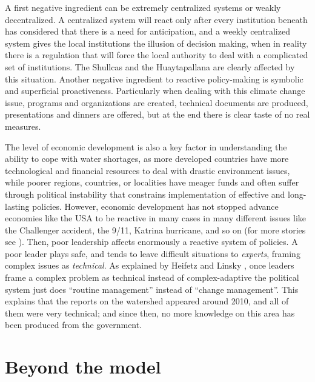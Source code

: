 \documentclass{article}
\begin{document}
A first negative ingredient can be extremely centralized systems or weakly decentralized. A centralized system will react only after every institution beneath has considered that there is a need for anticipation, and a weekly centralized system gives the local institutions the illusion of decision making, when in reality there is a regulation that will force the local authority to deal with a complicated set of institutions. The Shullcas and the Huaytapallana are clearly affected by this situation. Another negative ingredient to reactive policy-making is symbolic and superficial proactiveness. Particularly when dealing with this climate change issue, programs and organizations are created, technical documents are produced, presentations and dinners are offered, but at the end there is clear taste of no real measures. 

The level of economic development is also a key factor in understanding the ability to cope with water shortages, as more developed countries have more technological and financial resources to deal with drastic environment issues, while poorer regions, countries, or localities have meager funds and often suffer through political instability that constrains implementation of effective and long-lasting policies. However, economic development has not stopped advance economies like the USA to be reactive in many cases in many different issues like the Challenger accident, the 9/11, Katrina hurricane, and so on (for more stories see \cite{bazerman_predictable_2004}). Then, poor leadership affects enormously a reactive system of policies. A poor leader plays safe, and tends to leave difficult situations to \emph{experts}, framing complex issues as \emph{technical}.  As explained by Heifetz and Linsky \cite{heifetz_leadership_2002}, 
once leaders frame a complex problem as technical instead of complex-adaptive the political system just does ``routine management'' instead of ``change management''. This explains that the reports on the watershed appeared around 2010, and all of them were very technical; and since then, no more knowledge on this area has been produced from the government.



\section{Beyond the model}
\end{document}
